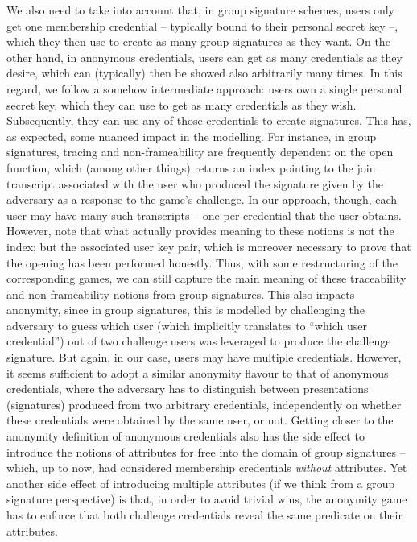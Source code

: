 We also need to take into account that, in group signature schemes, users only
get one membership credential -- typically bound to their personal secret
key --, which they then use to create as many group signatures as they want. On
the other hand, in anonymous credentials, users can get as many credentials as
they desire, which can (typically) then be showed also arbitrarily many times.
In this regard, we follow a somehow intermediate approach: users own a single
personal secret key, which they can use to get as many credentials as they wish.
Subsequently, they can use any of those credentials to create \GSAC signatures.
This has, as expected, some nuanced impact in the modelling. For instance, in
group signatures, tracing and non-frameability are frequently dependent on the
open function, which (among other things) returns an index pointing to the join
transcript associated with the user who produced the signature given by the
adversary as a response to the game's challenge. In our approach, though, each
user may have many such transcripts -- one per credential that the user
obtains. However, note that what actually provides meaning to these notions
is not the index; but the associated user key pair, which is moreover necessary
to prove that the opening has been performed honestly. Thus, with some
restructuring of the corresponding games, we can still capture the main
meaning of these traceability and non-frameability notions from group
signatures. This also impacts anonymity, since in group signatures, this is
modelled by challenging the adversary to guess which user (which implicitly
translates to ``which user credential'') out of two challenge users was
leveraged to produce the challenge signature. But again, in our case, users may
have multiple credentials. However, it seems sufficient to adopt a similar
anonymity flavour to that of anonymous credentials, where the adversary has to
distinguish between presentations (signatures) produced from two arbitrary
credentials, independently on whether these credentials were obtained by the
same user, or not.
%
Getting closer to the anonymity definition of anonymous credentials also has the
side effect to introduce the notions of attributes for free into the domain of
group signatures -- which, up to now, had considered membership credentials
\emph{without} attributes. Yet another side effect of introducing multiple
attributes (if we think from a group signature perspective) is that, in order
to avoid trivial wins, the anonymity game has to enforce that both challenge
credentials reveal the same predicate on their attributes.

